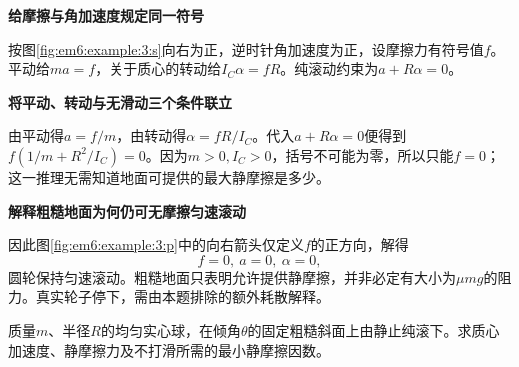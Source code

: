 \begin{solution}\textbf{给摩擦与角加速度规定同一符号}\par\nobreak
按图\ref{fig:em6:example:3:s}向右为正，逆时针角加速度为正，设摩擦力有符号值$f$。平动给$ma=f$，关于质心的转动给$I_C\alpha=fR$。纯滚动约束为$a+R\alpha=0$。



\par\medskip{}\noindent\textbf{将平动、转动与无滑动三个条件联立}\par\nobreak
由平动得$a=f/m$，由转动得$\alpha=fR/I_C$。代入$a+R\alpha=0$便得到$f(1/m+R^2/I_C)=0$。因为$m>0,I_C>0$，括号不可能为零，所以只能$f=0$；这一推理无需知道地面可提供的最大静摩擦是多少。



\par\medskip{}\noindent\textbf{解释粗糙地面为何仍可无摩擦匀速滚动}\par\nobreak
因此图\ref{fig:em6:example:3:p}中的向右箭头仅定义$f$的正方向，解得
\[\boxed{f=0,\ a=0,\ \alpha=0},\]
圆轮保持匀速滚动。粗糙地面只表明允许提供静摩擦，并非必定有大小为$\mu mg$的阻力。真实轮子停下，需由本题排除的额外耗散解释。\end{solution}
\begin{question}\begin{example}[实心球沿斜面滚下]\label{em6:example:4}
质量$m$、半径$R$的均匀实心球，在倾角$\theta$的固定粗糙斜面上由静止纯滚下。求质心加速度、静摩擦力及不打滑所需的最小静摩擦因数。
\end{example}
\end{question}
